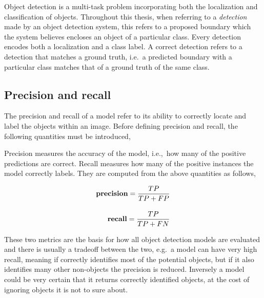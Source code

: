 Object detection is a multi-task problem incorporating both the localization and classification of objects.
Throughout this thesis, when referring to a \textit{detection} made by an object detection system, this refers to a proposed boundary which the system believes encloses an object of a particular class.
Every detection encodes both a localization and a class label.
A correct detection refers to a detection that matches a ground truth, i.e.\ a predicted boundary with a particular class matches that of a ground truth of the same class.

\subsection{Precision and recall}
The precision and recall of a model refer to its ability to correctly locate and label the objects within an image.
Before defining precision and recall, the following quantities must be introduced,

\begin{center}
  {\setlength{\fboxsep}{1em}
  }
\end{center}

Precision measures the accuracy of the model, i.e.,~how many of the positive predictions are correct.
Recall measures how many of the positive instances the model correctly labels.
They are computed from the above quantities as follows,

\begin{align*}
  \text{\bf precision}=\frac{TP}{TP+FP}\\[1em]
  \text{\bf recall}=\frac{TP}{TP+FN}
\end{align*}

These two metrics are the basis for how all object detection models are evaluated and there is usually a tradeoff between the two, e.g.\ a model can have very high recall, meaning if correctly identifies most of the potential objects, but if it also identifies many other non-objects the precision is reduced.
Inversely a model could be very certain that it returns correctly identified objects, at the cost of ignoring objects it is not to sure about.

